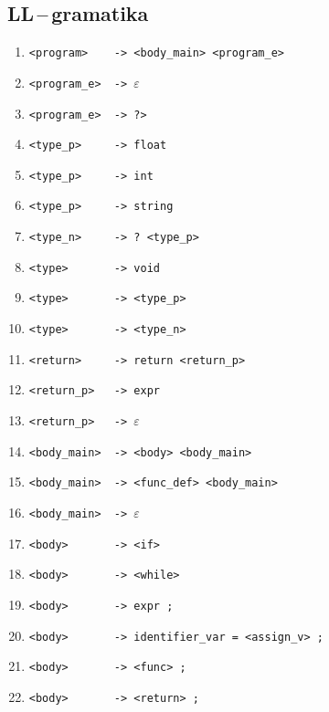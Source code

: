 \documentclass[a4paper,12pt]{article}
\begin{document}
\subsection{LL\,--\,gramatika}
\begin{table}[!ht]
	\centering
	\begin{enumerate}[noitemsep]
		\item \verb|<program>    -> <body_main> <program_e>|
		      		      		      		      		      		      		      		      		      	   
		\item \verb|<program_e>  -> |$\varepsilon$
		\item \verb|<program_e>  -> ?>|
		      		      		      		      		      		      		    		      		      		    
		\item \verb|<type_p>     -> float|
		\item \verb|<type_p>     -> int|
		\item \verb|<type_p>     -> string|
		\item \verb|<type_n>     -> ? <type_p>|
		\item \verb|<type>       -> void|
		\item \verb|<type>       -> <type_p>|
		\item \verb|<type>       -> <type_n>|
		      		      		      		      		      		      		      	      		      	      
		\item \verb|<return>     -> return <return_p>|
		\item \verb|<return_p>   -> expr|
		\item \verb|<return_p>   -> |$\varepsilon$
		      		      		      		      		      		      		      	      		      		    
		\item \verb|<body_main>  -> <body> <body_main>|
		\item \verb|<body_main>  -> <func_def> <body_main>|
		\item \verb|<body_main>  -> |$\varepsilon$
		      		      		      		      		      		      		      		      		      	    
		\item \verb|<body>       -> <if>|
		\item \verb|<body>       -> <while>|
		\item \verb|<body>       -> expr ;|
		\item \verb|<body>       -> identifier_var = <assign_v> ;|
		\item \verb|<body>       -> <func> ;|
		\item \verb|<body>       -> <return> ;|
		      		      		      		      		      		      		              

\end{enumerate}
\end{table}
\end{document}
